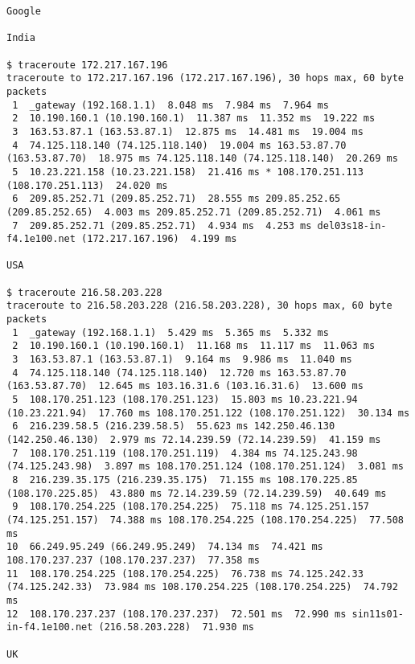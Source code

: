 \documentclass[a4paper]{article}
\begin{document}
\begin{lstlisting}
Google

India

$ traceroute 172.217.167.196
traceroute to 172.217.167.196 (172.217.167.196), 30 hops max, 60 byte packets
 1  _gateway (192.168.1.1)  8.048 ms  7.984 ms  7.964 ms
 2  10.190.160.1 (10.190.160.1)  11.387 ms  11.352 ms  19.222 ms
 3  163.53.87.1 (163.53.87.1)  12.875 ms  14.481 ms  19.004 ms
 4  74.125.118.140 (74.125.118.140)  19.004 ms 163.53.87.70 (163.53.87.70)  18.975 ms 74.125.118.140 (74.125.118.140)  20.269 ms
 5  10.23.221.158 (10.23.221.158)  21.416 ms * 108.170.251.113 (108.170.251.113)  24.020 ms
 6  209.85.252.71 (209.85.252.71)  28.555 ms 209.85.252.65 (209.85.252.65)  4.003 ms 209.85.252.71 (209.85.252.71)  4.061 ms
 7  209.85.252.71 (209.85.252.71)  4.934 ms  4.253 ms del03s18-in-f4.1e100.net (172.217.167.196)  4.199 ms

USA

$ traceroute 216.58.203.228
traceroute to 216.58.203.228 (216.58.203.228), 30 hops max, 60 byte packets
 1  _gateway (192.168.1.1)  5.429 ms  5.365 ms  5.332 ms
 2  10.190.160.1 (10.190.160.1)  11.168 ms  11.117 ms  11.063 ms
 3  163.53.87.1 (163.53.87.1)  9.164 ms  9.986 ms  11.040 ms
 4  74.125.118.140 (74.125.118.140)  12.720 ms 163.53.87.70 (163.53.87.70)  12.645 ms 103.16.31.6 (103.16.31.6)  13.600 ms
 5  108.170.251.123 (108.170.251.123)  15.803 ms 10.23.221.94 (10.23.221.94)  17.760 ms 108.170.251.122 (108.170.251.122)  30.134 ms
 6  216.239.58.5 (216.239.58.5)  55.623 ms 142.250.46.130 (142.250.46.130)  2.979 ms 72.14.239.59 (72.14.239.59)  41.159 ms
 7  108.170.251.119 (108.170.251.119)  4.384 ms 74.125.243.98 (74.125.243.98)  3.897 ms 108.170.251.124 (108.170.251.124)  3.081 ms
 8  216.239.35.175 (216.239.35.175)  71.155 ms 108.170.225.85 (108.170.225.85)  43.880 ms 72.14.239.59 (72.14.239.59)  40.649 ms
 9  108.170.254.225 (108.170.254.225)  75.118 ms 74.125.251.157 (74.125.251.157)  74.388 ms 108.170.254.225 (108.170.254.225)  77.508 ms
10  66.249.95.249 (66.249.95.249)  74.134 ms  74.421 ms 108.170.237.237 (108.170.237.237)  77.358 ms
11  108.170.254.225 (108.170.254.225)  76.738 ms 74.125.242.33 (74.125.242.33)  73.984 ms 108.170.254.225 (108.170.254.225)  74.792 ms
12  108.170.237.237 (108.170.237.237)  72.501 ms  72.990 ms sin11s01-in-f4.1e100.net (216.58.203.228)  71.930 ms

UK


\end{lstlisting}
\end{document}
